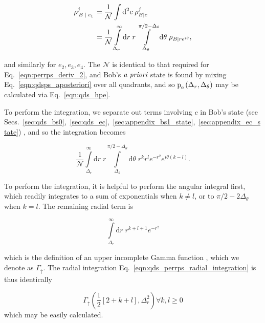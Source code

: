 \begin{align}\label{eqn:qdsps_aposteriori}
\rho_{\left.B \given e_1\right.}^j &= \frac{1}{\mathcal{N}} \int \Diff2 c \; \rho_{B | c}^j \notag \\
%
&=\frac{1}{\mathcal{N}} \int\limits_{\Delta_r}^\infty \mathrm{d}r\; r\int\limits_{\Delta_\theta}^{\pi/2 - \Delta_\theta} \mathrm{d}\theta \; \rho_{B | r e^{i \theta}},
\end{align}

\noindent and similarly for $e_2, e_3, e_4$. The $\mathcal{N}$ is identical to that required for Eq.~\ref{eqn:perrps_deriv_2}, and Bob's $\emph{a priori}$ state is found by mixing Eq.~\ref{eqn:qdsps_aposteriori} over all quadrants, and so $\text{p}_{\text{e}}\left(\Delta_r, \Delta_\theta\right)$ may be calculated via Eq.~\ref{eqn:qds_hpe}. %

To perform the integration, we separate out terms involving $c$ in Bob's state (see Secs.~\ref{sec:qds_bs0},~\ref{sec:qds_ec},~\ref{sec:appendix_bs1_state},~\ref{sec:appendix_ec_state}) , and so the integration becomes

\begin{equation}
\frac{1}{\mathcal{N}} \int\limits_{\Delta_r}^{\infty} \mathrm{d}r \; r \int\limits_{\Delta_\theta}^{\pi/2 - \Delta_\theta} \mathrm{d}\theta \; r^k r^l e^{-r^2} e^{i \theta \left(k - l\right)}.
\end{equation}

\noindent To perform the integration, it is helpful to perform the angular integral first, which readily integrates to a sum of exponentials when $k \ne l$, or to $\pi/2 - 2\Delta_\theta$ when $k=l$. The remaining radial term is

\begin{equation}\label{eqn:qds_perrps_radial_integration}
\int\limits_{\Delta_r}^\infty \mathrm{d}r \; r^{k + l + 1} e^{-r^2}
\end{equation}

\noindent which is the definition of an upper incomplete Gamma function \cite{mathworld_incomplete_gamma}, which we denote as $\Gamma_\uparrow$. The radial integration Eq.~\ref{eqn:qds_perrps_radial_integration} is thus identically

\begin{equation}
\Gamma_{\uparrow}\left(\frac{1}{2}\left[2 + k + l\right], \Delta_r^2\right)  \forall k, l \ge 0
\end{equation}
which may be easily calculated.

